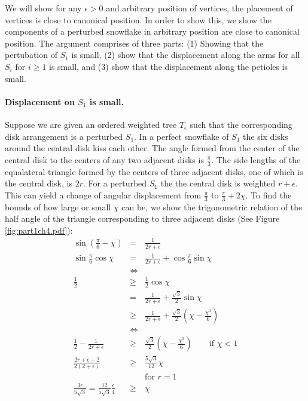 \documentclass[10pt]{CSUNthesis}
\theoremstyle{plain}%
\theoremstyle{definition}
\theoremstyle{remark}
\newcommand{\lr}[1]{\left( #1 \right)}
\begin{document}
We will show for any $\epsilon >0$ and arbitrary position of vertices, the placement of vertices is close to canonical position.  
In order to show this, we show the components of a perturbed snowflake in arbitrary position  are close to canonical position.  
The argument comprises of three parts: (1) Showing that the pertubation of $S_1$ is small, (2) show that the displacement along the arms for all $S_i$ for $i \geq 1$ is small, and (3) show that the displacement along the petioles is small.  

\paragraph{Displacement on $S_1$ is small.}
Suppose we are given an ordered weighted tree $T_\epsilon$ such that the corresponding disk arrangement is a perturbed $S_1$.  
In a perfect snowflake of $S_1$ the six disks around the central disk kiss each other.  
The angle formed from the center of the central disk to the centers of any two adjacent disks is $\frac{\pi}{3}$.  
The side lengths of the equalateral triangle formed by the centers of three adjacent disks, one of which is the central disk, is $2r$.  
For a perturbed $S_1$ the the central disk is weighted $r+ \epsilon$.  
This can yield a change of angular displacement from $\frac{\pi}{3}$ to $\frac{\pi}{3} + 2\chi$.  
To find the bounds of how large or small $\chi$ can be, we show the trigonometric relation of the half angle of the triangle corresponding to three adjacent disks (See Figure \ref{fig:part1ch4.pdf}):
\begin{eqnarray*}
\sin \lr{\frac{\pi}{6} - \chi} &=& \frac{1}{2r+\epsilon}\\
\sin \frac{\pi}{6} \cos \chi &=& \frac{1}{2r+\epsilon} + \cos \frac{\pi}{6} \sin \chi\\
&\iff&\\
\frac{1}{2} &\geq& \frac{1}{2} \cos \chi \\
&=& \frac{1}{2r+\epsilon} + \frac{\sqrt{3}}{2} \sin \chi\\
&\geq& \frac{1}{2r+\epsilon} + \frac{\sqrt{3}}{2} \lr{ \chi - \frac{\chi^3}{6}}\\
&\iff&\\
\frac{1}{2}-\frac{1}{2r+\epsilon} &\geq& \frac{\sqrt{3}}{2} \lr{ \chi - \frac{\chi^3}{6}} \qquad \text{if }\chi < 1\\
\frac{2r + \epsilon - 2}{2 ( 2 + \epsilon)} &\geq&  \frac{5\sqrt{3}}{12} \chi\\
&&\text{for $r=1$}\\
\frac{3 \epsilon}{5\sqrt{3}}=\frac{12}{5\sqrt{3}} \frac{\epsilon}{4} &\geq& \chi
\end{eqnarray*}
\end{document}
